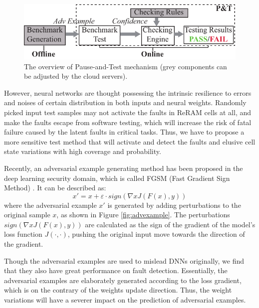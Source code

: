 \begin{figure}
    \centering
    \includegraphics[width=0.6\linewidth]{images/OL-fig4}
    \caption{The overview of Pause-and-Test mechanism (grey components can be adjusted by the cloud servers). }
    \label{fig:ptest}
    \vspace{-10pt}
\end{figure}
                                                                                        
However, neural networks are thought possessing the intrinsic resilience to errors and noises of certain distribution in both inputs and neural weights. Randomly picked input test samples may not activate the faults in ReRAM cells at all, and make the faults escape from software testing, which will increase the risk of fatal failure caused by the latent faults in critical tasks. Thus, we have to propose a more sensitive test method that will activate and detect the faults and elusive cell state variations with high coverage and probability.
                                                                                                
Recently, an adversarial example generating method has been proposed in the deep learning security domain, which is called FGSM (Fast Gradient Sign Method) \cite{43405}. It can be described as:
\begin{equation}
    \label{equ:adv_generate}
    x' = x + \varepsilon  \cdot sign(\nabla xJ(F(x),y))
\end{equation} 
where the adversarial example $x'$ is generated by adding perturbations to the original sample $x$, as shown in Figure \ref{fig:advexample}. The perturbations $sign(\nabla xJ(F(x),y))$ are calculated as the sign of the gradient of the model's loss function $J(\cdot,\cdot)$, pushing the original input move towards the direction of the gradient. 
                                                                                                                                        
Though the adversarial examples are used to mislead DNNs originally, we find that they also have great performance on fault detection. Essentially, the adversarial examples are elaborately generated according to the loss gradient, which is on the contrary of the weights update direction. Thus, the weight variations will have a severer impact on the prediction of adversarial examples.  
                                                                                                                                                
